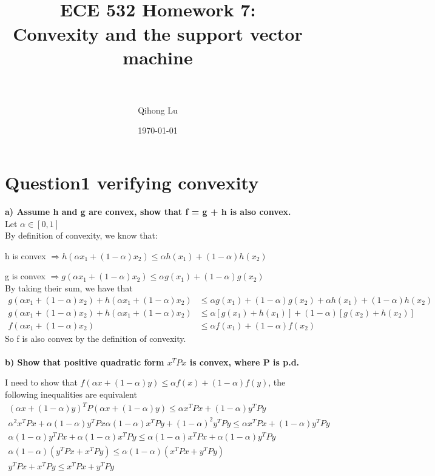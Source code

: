 \documentclass[paper=a4, fontsize=11pt]{scrartcl} %
\title{	
\normalfont \normalsize 
\horrule{0.5pt} \\[0.4cm] %
\huge ECE 532 Homework 7: \\Convexity and the support vector machine\\ %
\horrule{2pt} \\[0.5cm] %
}
\author{Qihong Lu} %
\date{\normalsize\today} %
\numberwithin{equation}{section} %
\numberwithin{figure}{section} %
\numberwithin{table}{section} %
\begin{document}
\maketitle %


\section*{Question1 verifying convexity}

\textbf{a) Assume h and g are convex, show that f = g + h is also convex.} \\ 

Let $\alpha \in [0,1]$\\
By definition of convexity, we know that: 

\hspace{1cm} h is convex $\Rightarrow h(\alpha x_1 + (1-\alpha)x_2) \leq \alpha h(x_1) + (1-\alpha) h(x_2)$

\hspace{1cm} g is convex $\Rightarrow g(\alpha x_1 + (1-\alpha)x_2) \leq \alpha g(x_1) + (1-\alpha) g(x_2)$\\

By taking their sum, we have that 
\begin{align*}
g(\alpha x_1 + (1-\alpha)x_2) + h(\alpha x_1 + (1-\alpha)x_2) &\leq \alpha g(x_1) + (1-\alpha) g(x_2) + \alpha h(x_1) + (1-\alpha) h(x_2)	\\
g(\alpha x_1 + (1-\alpha)x_2) + h(\alpha x_1 + (1-\alpha)x_2) &\leq \alpha [g(x_1) + h(x_1)] + (1-\alpha) [g(x_2)  + h(x_2)]	\\
f(\alpha x_1 + (1-\alpha)x_2) &\leq \alpha f(x_1) + (1-\alpha) f(x_2)
\end{align*}
So f is also convex by the definition of convexity. \\\\

\newpage
\textbf{b) Show that positive quadratic form $x^TPx$ is convex, where P is p.d.}

I need to show that 
$f(\alpha x + (1-\alpha)y) \leq \alpha f(x) + (1-\alpha) f(y)$, the following inequalities are equivalent
\begin{align*}
(\alpha x + (1-\alpha)y)^T P (\alpha x + (1-\alpha)y) \leq \alpha x^T P x + (1-\alpha)y^TP y	\\
\alpha^2 x^T P  x + \alpha(1-\alpha)y^T P  x
\alpha(1-\alpha) x^T P y+ (1-\alpha)^2y^T P y
\leq \alpha x^T P x + (1-\alpha)y^TP y \\
\alpha(1-\alpha)y^T P x + \alpha(1-\alpha) x^T P y
\leq \alpha(1 - \alpha) x^T P x + \alpha(1 - \alpha)y^TP y \\
\alpha(1-\alpha)(y^T P x + x^T P y)
\leq \alpha(1 - \alpha) (x^T P x + y^TP y) \\
y^T P x + x^T P y \leq x^T P x + y^TP y \\
\end{align*}
\end{document}
